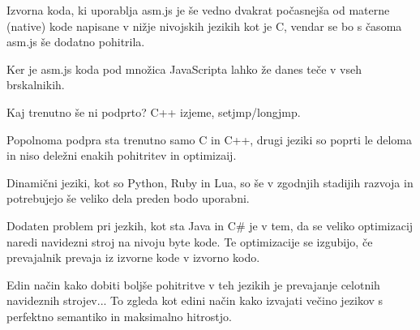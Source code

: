 Izvorna koda, ki uporablja asm.js je še vedno dvakrat počasnejša od materne (native) kode napisane v nižje nivojskih jezikih kot je C, vendar se bo s časoma asm.js še dodatno pohitrila.

Ker je asm.js koda pod množica JavaScripta lahko že danes teče v vseh brskalnikih.  

Kaj trenutno še ni podprto? C++ izjeme, setjmp/longjmp.

Popolnoma podpra sta trenutno samo C in C++, drugi jeziki so poprti le deloma in niso deležni enakih pohitritev in optimizaij.

Dinamični jeziki, kot so Python, Ruby in Lua, so še v zgodnjih stadijih razvoja in potrebujejo še veliko dela preden bodo uporabni.

Dodaten problem pri jezkih, kot sta Java in C\# je v tem, da se veliko optimizacij naredi navidezni stroj na nivoju byte kode. Te optimizacije se izgubijo, če prevajalnik prevaja iz izvorne kode v izvorno kodo.

Edin način kako dobiti boljše pohitritve v teh jezikih je prevajanje celotnih navideznih strojev... To zgleda kot edini način kako izvajati večino jezikov s perfektno semantiko in maksimalno hitrostjo.

